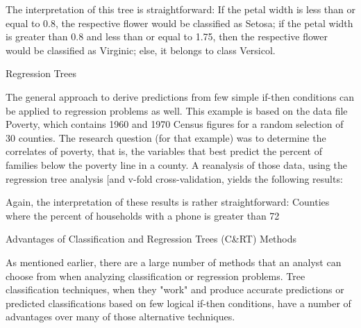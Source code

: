 The interpretation of this tree is straightforward: If the petal width is less than or equal to 0.8, the respective flower would be classified as Setosa; if the petal width is greater than 0.8 and less than or equal to 1.75, then the respective flower would be classified as Virginic; else, it belongs to class Versicol.


 

Regression Trees

The general approach to derive predictions from few simple if-then conditions can be applied to regression problems as well. This example is based on the data file Poverty, which contains 1960 and 1970 Census figures for a random selection of 30 counties. The research question (for that example) was to determine the correlates of poverty, that is, the variables that best predict the percent of families below the poverty line in a county. A reanalysis of those data, using the regression tree analysis [and v-fold cross-validation, yields the following results:



Again, the interpretation of these results is rather straightforward: Counties where the percent of households with a phone is greater than 72%


 

Advantages of Classification and Regression Trees (C&RT) Methods

As mentioned earlier, there are a large number of methods that an analyst can choose from when analyzing classification or regression problems. Tree classification techniques, when they "work" and produce accurate predictions or predicted classifications based on few logical if-then conditions, have a number of advantages over many of those alternative techniques.

